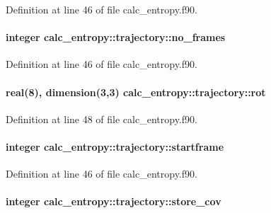 Definition at line 46 of file calc\-\_\-entropy.\-f90.

\hypertarget{structcalc__entropy_1_1trajectory_adf0e530d84e91fdbc0cec327f9a9c2ef}{
\paragraph[{no\-\_\-frames}]{\setlength{\rightskip}{0pt plus 5cm}integer calc\-\_\-entropy\-::trajectory\-::no\-\_\-frames}}\label{structcalc__entropy_1_1trajectory_adf0e530d84e91fdbc0cec327f9a9c2ef}


Definition at line 46 of file calc\-\_\-entropy.\-f90.

\hypertarget{structcalc__entropy_1_1trajectory_a1a969b71f000083c3ec56fcc744b010f}{
\paragraph[{rot}]{\setlength{\rightskip}{0pt plus 5cm}real(8), dimension(3,3) calc\-\_\-entropy\-::trajectory\-::rot}}\label{structcalc__entropy_1_1trajectory_a1a969b71f000083c3ec56fcc744b010f}


Definition at line 48 of file calc\-\_\-entropy.\-f90.

\hypertarget{structcalc__entropy_1_1trajectory_a28ac01dabd46897dc57829d565024cce}{
\paragraph[{startframe}]{\setlength{\rightskip}{0pt plus 5cm}integer calc\-\_\-entropy\-::trajectory\-::startframe}}\label{structcalc__entropy_1_1trajectory_a28ac01dabd46897dc57829d565024cce}


Definition at line 46 of file calc\-\_\-entropy.\-f90.

\hypertarget{structcalc__entropy_1_1trajectory_ab4de63f777ed6c1da6e7fdb88ad5ae78}{
\paragraph[{store\-\_\-cov}]{\setlength{\rightskip}{0pt plus 5cm}integer calc\-\_\-entropy\-::trajectory\-::store\-\_\-cov}}\label{structcalc__entropy_1_1trajectory_ab4de63f777ed6c1da6e7fdb88ad5ae78}


